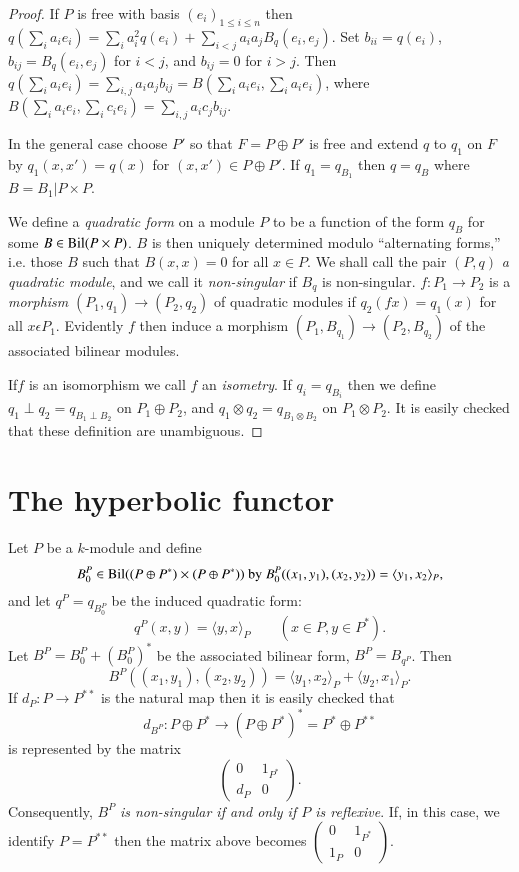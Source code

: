 \begin{proof}
If $P$ is free with basis $(e_i)_{1 \leq i \leq n}$ then
$q(\sum \limits_i a_i e_i) = \sum\limits_i a^2_i q(e_i) +
\sum\limits_{i < j} a_i a_j B_q (e_i, e_j)$. Set $b_{ii} = q(e_i)$, 
$b_{ij} = B_q (e_i, e_j)$ for $i < j$, and $b_{ij}=0$ for $i >j$.
Then $q (\sum\limits_i a_i e_i) = \sum\limits_{i, j}a_i a_j
b_{ij} = B (\sum\limits_i a_i e_i, \sum\limits_i a_i e_i)$, where
$B(\sum\limits_i a_i e_i, \sum\limits_i c_i e_i) = \sum\limits_{i,
  j} a_i c_j b_{ij}$.  

In the general case choose $P'$ so that $F= P \oplus P'$ is free and 
extend $q$ to $q_1$ on $F$ by $q_1(x, x') = q(x)$ for $(x, x') \in P
\oplus P'$. If $q_1 = q_{B_1}$ then $q = q_B$ where $B = B_1 \big| P
\times P$.  

We define a \textit{quadratic form} on a module $P$ to be a function
of the form $q_B$ for some $B \in \operatorname{Bil} (P \times P)$. $B$ is then
uniquely determined modulo ``alternating forms,'' i.e. those $B$ such
that $B(x, x) = 0$ for all $x \in P$. We shall call the pair $(P, q)$
\textit{a quadratic module}, and we call it \textit{non-singular} if
$B_q$ is non-singular. $f: P_1 \to P_2$ is a \textit{morphism}
$(P_1, q_1) \to (P_2, q_2)$ of quadratic modules if $q_2(fx)=q_1(x)$
for all $x \epsilon P_1$. Evidently $f$ then induce a morphism $(P_1,
B_{q_1}) \to (P_2, B_{q_2})$ of the associated bilinear modules. 

If\pageoriginale $f$ is an isomorphism we call $f$ an
\textit{isometry}. If $q_i = 
q_{B_i}$ then we define $q_1 \perp q_2 = q_{B_1 \perp B_2}$ on $P_1
\oplus P_2$, and $q_1 \otimes q_2 = q_{B_1 \otimes B_2}$ on $P_1
\otimes P_2$. It is easily checked that these definition are
unambiguous. 
\end{proof}

\section{The hyperbolic functor}\label{chap5:sec2}%

Let $P$ be a $k$-module and define
$$
B^P_0 \in \operatorname{Bil} (( P \oplus P^\ast) \times (P \oplus P^\ast)) \text{ by }  
B^P_0 ((x_1, y_1), (x_2, y_2)) = \langle y_1, x_2 \rangle_P,
$$
and let $q^P = q_{B^P_0}$ be the induced quadratic form:
$$
q^P (x, y) = \langle y, x \rangle_P \qquad (x \in P, y \in P^*). 
$$
Let $B^P = B^P_0 + (B^P_0)^\ast$ be the associated bilinear form, $B^P =
B_{q^P}$. Then 
$$
B^P (( x_1, y_1), (x_2, y_2)) = \langle y_1, x_2 \rangle_P + \langle 
y_2, x_1 \rangle_P. 
$$
If $d_P: P \to P^{\ast\ast}$ is the natural map then it is easily
checked that  
$$
d_{B^P}: P \oplus P^\ast \to (P \oplus P^\ast)^\ast = P^\ast \oplus P^{\ast\ast} 
$$
is represented by the matrix
$$
\begin{pmatrix} 
0 & 1_{P^\ast} \\
d_P & 0 
\end{pmatrix}.
$$
Consequently, $B^P$ \textit{is non-singular if and only if $P$ is
  reflexive}. If, in this case, we identify $P = P^{**}$ then the
matrix above becomes $ \left( \begin{smallmatrix} 0 & 1_{P^*} \\ 1_P &
  0 \end{smallmatrix} \right)$. 

